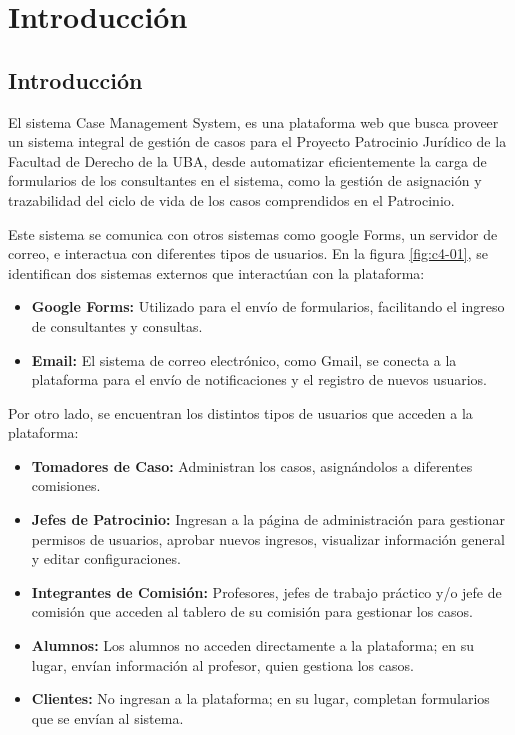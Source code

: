 \chapter{Introducción}
\label{cap:introduccion}

\section{Introducción}
\label{sec:introduccion:intro}
El sistema Case Management System, es una plataforma web que busca proveer un sistema integral de gestión de casos para el Proyecto Patrocinio Jurídico de la Facultad de Derecho de la UBA, desde automatizar eficientemente la carga de formularios de los consultantes en el sistema, como la gestión de asignación y trazabilidad del ciclo de vida de los casos comprendidos en el Patrocinio.

Este sistema se comunica con otros sistemas como google Forms, un servidor de correo, e interactua con diferentes tipos de usuarios.
En la figura \ref{fig:c4-01}, se identifican dos sistemas externos que interactúan con la plataforma:

\begin{itemize}
    \item \textbf{Google Forms:} Utilizado para el envío de formularios, facilitando el ingreso de consultantes y consultas.
    \item \textbf{Email:} El sistema de correo electrónico, como Gmail, se conecta a la plataforma para el envío de notificaciones y el registro de nuevos usuarios.
\end{itemize}

Por otro lado, se encuentran los distintos tipos de usuarios que acceden a la plataforma:

\begin{itemize}
    \item \textbf{Tomadores de Caso:} Administran los casos, asignándolos a diferentes comisiones.
    \item \textbf{Jefes de Patrocinio:} Ingresan a la página de administración para gestionar permisos de usuarios, aprobar nuevos ingresos, visualizar información general y editar configuraciones.
    \item \textbf{Integrantes de Comisión:} Profesores, jefes de trabajo práctico y/o jefe de comisión que acceden al tablero de su comisión para gestionar los casos.
    \item \textbf{Alumnos:} Los alumnos no acceden directamente a la plataforma; en su lugar, envían información al profesor, quien gestiona los casos.
    \item \textbf{Clientes:} No ingresan a la plataforma; en su lugar, completan formularios que se envían al sistema.
\end{itemize}

